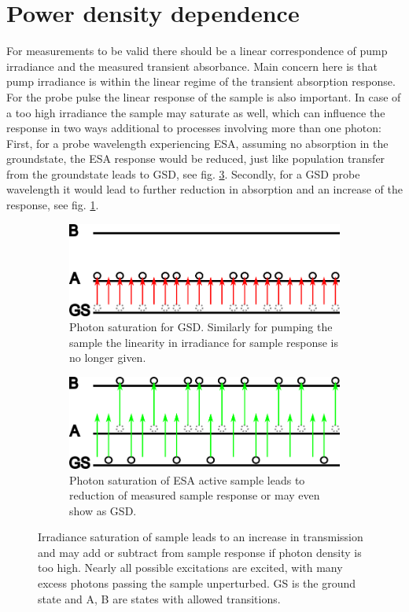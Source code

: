 \documentclass[twoside,openright,listof=numbered]{scrreprt}
\begin{document}
\section{Power density dependence}\label{sec:powerVar}
For measurements to be valid there should be a linear correspondence of pump irradiance and the measured transient absorbance. Main concern here is that pump irradiance is within the linear regime of the transient absorption response. For the probe pulse the linear response of the sample is also important. In case of a too high irradiance the sample may saturate as well, which can influence the response in two ways additional to processes involving more than one photon: First, for a probe wavelength experiencing ESA, assuming no absorption in the groundstate, the ESA response would be reduced, just like population transfer from the groundstate leads to GSD, see fig. \ref{fig:photonSatESA}. Secondly, for a GSD probe wavelength it would lead to further reduction in absorption and an increase of the response, see fig. \ref{fig:photonSatGSD}.\\

\begin{figure}[h]
\centering
\begin{subfigure}[b]{0.5\linewidth}
\centering
\includegraphics[scale=1]{images/TA_saturation_GSD.png}
\caption{Photon saturation for GSD. Similarly for pumping the sample the linearity in irradiance for sample response is no longer given.\label{fig:photonSatGSD}}
\end{subfigure}\hfill
\begin{subfigure}[b]{0.5\linewidth}
\centering
\includegraphics[scale=1]{images/TA_saturation_ESA.png}
\caption{Photon saturation of ESA active sample leads to reduction of measured sample response or may even show as GSD.\label{fig:photonSatESA}}
\end{subfigure}
\caption[Visualisation of photon saturation behaviour for GSD and ESA.]{Irradiance saturation of sample leads to an increase in transmission and may add or subtract from sample response if photon density is too high. Nearly all possible excitations are excited, with many excess photons passing the sample unperturbed.  GS is the ground state and A, B are states with allowed transitions.}
\end{figure}
\end{document}
